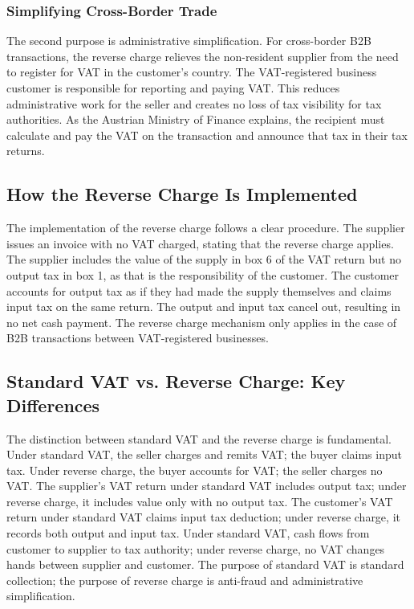 \documentclass[11pt]{article}
\begin{document}
\subsubsection{Simplifying Cross-Border Trade}

The second purpose is administrative simplification. For cross-border B2B transactions, the reverse charge relieves the non-resident supplier from the need to register for VAT in the customer's country. The VAT-registered business customer is responsible for reporting and paying VAT. This reduces administrative work for the seller and creates no loss of tax visibility for tax authorities. As the Austrian Ministry of Finance explains, the recipient must calculate and pay the VAT on the transaction and announce that tax in their tax returns.

\subsection{How the Reverse Charge Is Implemented}

The implementation of the reverse charge follows a clear procedure. The supplier issues an invoice with no VAT charged, stating that the reverse charge applies. The supplier includes the value of the supply in box 6 of the VAT return but no output tax in box 1, as that is the responsibility of the customer. The customer accounts for output tax as if they had made the supply themselves and claims input tax on the same return. The output and input tax cancel out, resulting in no net cash payment. The reverse charge mechanism only applies in the case of B2B transactions between VAT-registered businesses.

\subsection{Standard VAT vs. Reverse Charge: Key Differences}

The distinction between standard VAT and the reverse charge is fundamental. Under standard VAT, the seller charges and remits VAT; the buyer claims input tax. Under reverse charge, the buyer accounts for VAT; the seller charges no VAT. The supplier's VAT return under standard VAT includes output tax; under reverse charge, it includes value only with no output tax. The customer's VAT return under standard VAT claims input tax deduction; under reverse charge, it records both output and input tax. Under standard VAT, cash flows from customer to supplier to tax authority; under reverse charge, no VAT changes hands between supplier and customer. The purpose of standard VAT is standard collection; the purpose of reverse charge is anti-fraud and administrative simplification.
\end{document}

